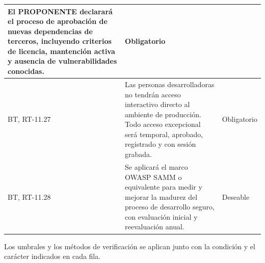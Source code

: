\begin{longtable}{|L{0.098425\AnchoTablaAnexo}|L{0.814961\AnchoTablaAnexo}|L{0.086614\AnchoTablaAnexo}|}
El PROPONENTE declarará el proceso de aprobación de nuevas dependencias de terceros, incluyendo criterios de licencia, mantención activa y ausencia de vulnerabilidades conocidas. &
Obligatorio \\ \hline
{}
BT, RT-11.27 &
Las personas desarrolladoras no tendrán acceso interactivo directo al ambiente de producción. Todo acceso excepcional será temporal, aprobado, registrado y con sesión grabada. &
Obligatorio \\ \hline
BT, RT-11.28 &
Se aplicará el marco OWASP SAMM o equivalente para medir y mejorar la madurez del proceso de desarrollo seguro, con evaluación inicial y reevaluación anual. &
Deseable \\ \hline
\end{longtable}

Los umbrales y los métodos de verificación se aplican junto con la condición y el carácter indicados en cada fila.
